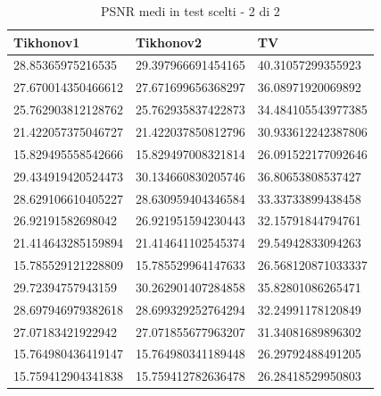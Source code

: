 \documentclass[12pt]{article}
\begin{document}
    \begin{table}[!ht]
    \centering
    \begin{tabular}{|l|l|l|}
    \hline
        Tikhonov1 & Tikhonov2 & TV \\ \hline
        28.85365975216535 & 29.397966691454165 & 40.31057299355923 \\ \hline
        27.670014350466612 & 27.671699656368297 & 36.08971920069892 \\ \hline
        25.762903812128762 & 25.762935837422873 & 34.484105543977385 \\ \hline
        21.422057375046727 & 21.422037850812796 & 30.933612242387806 \\ \hline
        15.829495558542666 & 15.829497008321814 & 26.091522177092646 \\ \hline
        29.434919420524473 & 30.134660830205746 & 36.80653808537427 \\ \hline
        28.629106610405227 & 28.630959404346584 & 33.33733899438458 \\ \hline
        26.92191582698042 & 26.921951594230443 & 32.15791844794761 \\ \hline
        21.414643285159894 & 21.414641102545374 & 29.54942833094263 \\ \hline
        15.785529121228809 & 15.785529964147633 & 26.568120871033337 \\ \hline
        29.72394757943159 & 30.262901407284858 & 35.82801086265471 \\ \hline
        28.697946979382618 & 28.699329252764294 & 32.24991178120849 \\ \hline
        27.07183421922942 & 27.071855677963207 & 31.34081689896302 \\ \hline
        15.764980436419147 & 15.764980341189448 & 26.29792488491205 \\ \hline
        15.759412904341838 & 15.759412782636478 & 26.28418529950803 \\ \hline
    \end{tabular}
    \caption{PSNR medi in test scelti - 2 di 2}
    \label{table:3}
    \end{table}
    \newpage
    
\end{document}
